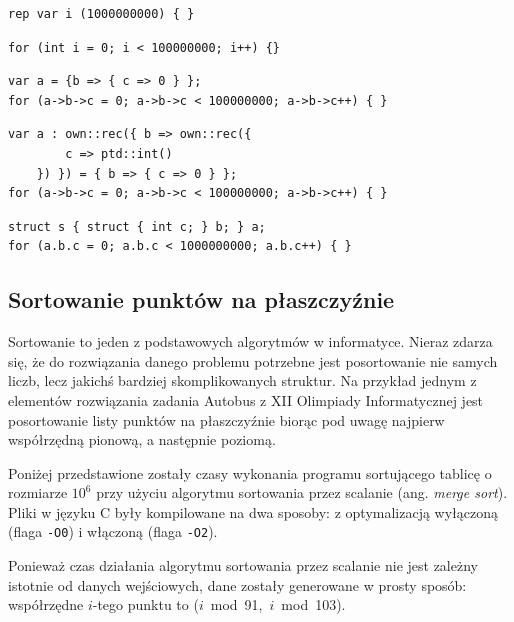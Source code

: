 \documentclass[licencjacka]{pracamgr}
\begin{document}
\begin{minipage}{\linewidth}
\begin{lstlisting}[caption={Iterator całkowitoliczbowy NL},label={lst:int_loop_nl},language=nl]
rep var i (1000000000) { }
\end{lstlisting}
\begin{lstlisting}[caption={Iterator całkowitoliczbowy C},label={lst:int_loop_c},language=nl]
for (int i = 0; i < 100000000; i++) {}
\end{lstlisting}
\begin{lstlisting}[caption={Iterator będący polem rekordu NL \texttt{ptd}},label={lst:rec_loop_ptd},language=nl]
var a = {b => { c => 0 } };
for (a->b->c = 0; a->b->c < 100000000; a->b->c++) { }
\end{lstlisting}
\begin{lstlisting}[caption={Iterator będący polem rekordu NL \texttt{own}},label={lst:rec_loop_own},language=nl]
var a : own::rec({ b => own::rec({
		c => ptd::int()
	}) }) = { b => { c => 0 } };
for (a->b->c = 0; a->b->c < 100000000; a->b->c++) { }
\end{lstlisting}
\begin{lstlisting}[caption={Iterator będący polem rekordu C},label={lst:rec_loop_c},language=my_c]
struct s { struct { int c; } b; } a;
for (a.b.c = 0; a.b.c < 1000000000; a.b.c++) { }
\end{lstlisting}
\end{minipage}

\subsection{Sortowanie punktów na płaszczyźnie}
Sortowanie to jeden z podstawowych algorytmów w informatyce.
Nieraz zdarza się, że do rozwiązania danego problemu potrzebne jest posortowanie nie samych liczb, lecz jakichś
bardziej skomplikowanych struktur.
Na przykład jednym z elementów rozwiązania zadania Autobus z XII Olimpiady Informatycznej\cite{autobus}
jest posortowanie listy
punktów na płaszczyźnie biorąc pod uwagę najpierw współrzędną pionową, a następnie poziomą.

Poniżej przedstawione zostały czasy wykonania programu sortującego tablicę o rozmiarze $10^6$ przy użyciu algorytmu
sortowania przez scalanie (ang. \textit{merge sort}). Pliki w języku C były kompilowane na dwa sposoby: z optymalizacją
wyłączoną (flaga \texttt{-O0}) i włączoną (flaga \texttt{-O2}).

Ponieważ czas działania algorytmu sortowania przez scalanie nie jest zależny istotnie od danych wejściowych,
dane zostały generowane w prosty sposób: współrzędne $i$-tego punktu to \mbox{($i$ mod 91, $i$ mod 103)}.
\end{document}
